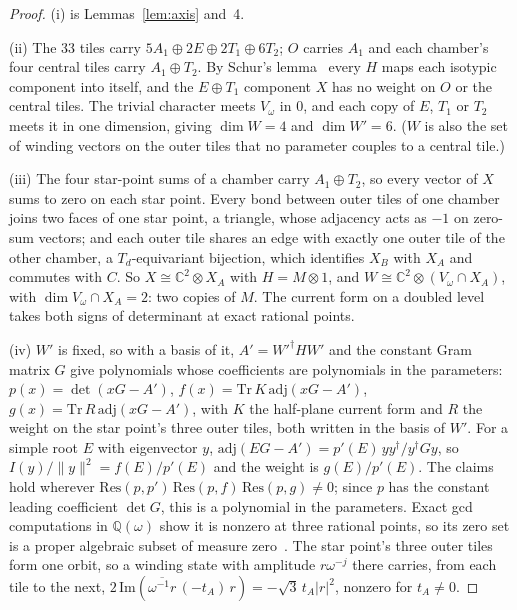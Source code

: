 \documentclass[twocolumn]{iopjournal}
\theoremstyle{definition}
\theoremstyle{remark}
\begin{document}
\begin{proof}
(i) is Lemmas~\ref{lem:axis} and~4.

(ii) The 33 tiles carry $5A_1 \oplus 2E \oplus 2T_1 \oplus 6T_2$; $O$
carries $A_1$ and each chamber's four central tiles carry $A_1 \oplus
T_2$. By Schur's lemma~\cite{Serre1977} every $H$ maps each isotypic
component into itself, and the $E \oplus T_1$ component $X$ has no
weight on $O$ or the central tiles. The trivial character meets
$V_\omega$ in $0$, and each copy of $E$, $T_1$ or $T_2$ meets it in one
dimension, giving $\dim W = 4$ and $\dim W' = 6$. ($W$ is also the set
of winding vectors on the outer tiles that no parameter couples to a
central tile.)

(iii) The four star-point sums of a chamber carry $A_1 \oplus T_2$, so
every vector of $X$ sums to zero on each star point. Every bond between
outer tiles of one chamber joins two faces of one star point, a
triangle, whose adjacency acts as $-1$ on zero-sum vectors; and each
outer tile shares an edge with exactly one outer tile of the other
chamber, a $T_d$-equivariant bijection, which identifies $X_B$ with
$X_A$ and commutes with $C$. So $X \cong \mathbb C^2 \otimes X_A$ with
$H = M \otimes 1$, and $W \cong \mathbb C^2 \otimes (V_\omega \cap X_A)$,
with $\dim V_\omega \cap X_A = 2$: two copies of $M$. The current form on a doubled level takes both
signs of determinant at exact rational points.

(iv) $W'$ is fixed, so with a basis of it, $A' = W'^\dagger HW'$ and
the constant Gram matrix $G$ give polynomials whose coefficients are
polynomials in the parameters:
$p(x) = \det(xG - A')$, $f(x) = \mathrm{Tr}\,K\,\mathrm{adj}(xG - A')$,
$g(x) = \mathrm{Tr}\,R\,\mathrm{adj}(xG - A')$, with $K$ the
half-plane current form and $R$ the weight on the star point's three
outer tiles, both written in the basis of $W'$. For a simple root $E$
with eigenvector $y$,
$\mathrm{adj}(EG - A') = p'(E)\,yy^\dagger/y^\dagger Gy$, so
$I(y)/\lVert y\rVert^2 = f(E)/p'(E)$ and the weight is $g(E)/p'(E)$.
The claims hold wherever
$\mathrm{Res}(p, p')\,\mathrm{Res}(p, f)\,\mathrm{Res}(p, g) \neq 0$;
since $p$ has the constant leading coefficient $\det G$, this is a
polynomial in the parameters. Exact gcd computations in
$\mathbb Q(\omega)$ show it is nonzero at three rational points, so its
zero set is a proper algebraic subset of measure zero~\cite{CLO}. The
star point's three outer tiles form one orbit, so a winding state with
amplitude $r\omega^{-j}$ there carries, from each tile to the next,
$2\,\mathrm{Im}(\overline{\omega^{-1}r}\,(-t_A)\,r) = -\sqrt3\,t_A\lvert
r\rvert^2$, nonzero for $t_A \neq 0$.
\end{proof}
\end{document}
